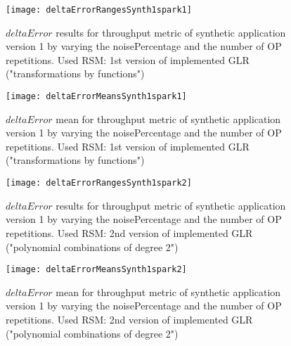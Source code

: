 \begin{figure}[htb]

    \centering
    
    \texttt{[image: deltaErrorRangesSynth1spark1]}
    
     \caption{$deltaError$ results for throughput metric of synthetic application version 1 by varying the noisePercentage and the number of OP repetitions. Used RSM: 1st version of implemented GLR ("transformations by functions")}
    
    \label{fig::synth1spark1::intervals}
    
\end{figure}

\begin{figure}[htb]

    \centering
    
    \texttt{[image: deltaErrorMeansSynth1spark1]}
    
    \caption{$deltaError$ mean for throughput metric of synthetic application version 1 by varying the noisePercentage and the number of OP repetitions. Used RSM: 1st version of implemented GLR ("transformations by functions")}
    
    \label{fig::synth1spark1::means}
    
\end{figure}





\begin{figure}[htb]

    \centering
    
    \texttt{[image: deltaErrorRangesSynth1spark2]}
    
     \caption{$deltaError$ results for throughput metric of synthetic application version 1 by varying the noisePercentage and the number of OP repetitions. Used RSM: 2nd version of implemented GLR ("polynomial combinations of degree 2")}
    
    \label{fig::synth1spark2::intervals}
    
\end{figure}

\begin{figure}[htb]

    \centering
    
    \texttt{[image: deltaErrorMeansSynth1spark2]}
    
    \caption{$deltaError$ mean for throughput metric of synthetic application version 1 by varying the noisePercentage and the number of OP repetitions. Used RSM: 2nd version of implemented GLR ("polynomial combinations of degree 2")}
    
    \label{fig::synth1spark2::means}
    
\end{figure}





